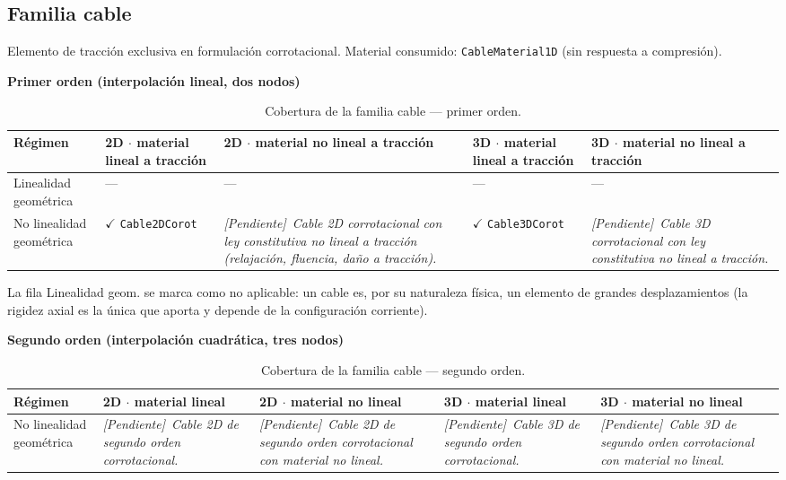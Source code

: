 \documentclass[11pt,oneside]{report}
\newcommand{\pendiente}[1]{\textcolor{pendienteorange}{\textit{[Pendiente]}~\textcolor{pendienteorange}{\textit{#1}}}}
\begin{document}
\subsection{Familia cable}

Elemento de tracción exclusiva en formulación corrotacional. Material consumido: \texttt{CableMaterial1D} (sin respuesta a compresión).

\textbf{Primer orden (interpolación lineal, dos nodos)}

\begin{table}[h]
\centering
\caption{Cobertura de la familia cable --- primer orden.}
\begin{tabularx}{\textwidth}{YYYYY}
\hline
\textbf{Régimen} & \textbf{2D \ensuremath{\cdot} material lineal a tracción} & \textbf{2D \ensuremath{\cdot} material no lineal a tracción} & \textbf{3D \ensuremath{\cdot} material lineal a tracción} & \textbf{3D \ensuremath{\cdot} material no lineal a tracción} \\
\hline
Linealidad geométrica & --- & --- & --- & --- \\
No linealidad geométrica & \ensuremath{\checkmark} \texttt{Cable2DCorot} & \pendiente{Cable 2D corrotacional con ley constitutiva no lineal a tracción (relajación, fluencia, daño a tracción).} & \ensuremath{\checkmark} \texttt{Cable3DCorot} & \pendiente{Cable 3D corrotacional con ley constitutiva no lineal a tracción.} \\
\hline
\end{tabularx}
\end{table}
La fila \textquotedbl{}Linealidad geom.\textquotedbl{} se marca como no aplicable: un cable es, por su naturaleza física, un elemento de grandes desplazamientos (la rigidez axial es la única que aporta y depende de la configuración corriente).

\textbf{Segundo orden (interpolación cuadrática, tres nodos)}

\begin{table}[h]
\centering
\caption{Cobertura de la familia cable --- segundo orden.}
\begin{tabularx}{\textwidth}{YYYYY}
\hline
\textbf{Régimen} & \textbf{2D \ensuremath{\cdot} material lineal} & \textbf{2D \ensuremath{\cdot} material no lineal} & \textbf{3D \ensuremath{\cdot} material lineal} & \textbf{3D \ensuremath{\cdot} material no lineal} \\
\hline
No linealidad geométrica & \pendiente{Cable 2D de segundo orden corrotacional.} & \pendiente{Cable 2D de segundo orden corrotacional con material no lineal.} & \pendiente{Cable 3D de segundo orden corrotacional.} & \pendiente{Cable 3D de segundo orden corrotacional con material no lineal.} \\
\hline
\end{tabularx}
\end{table}
\end{document}
